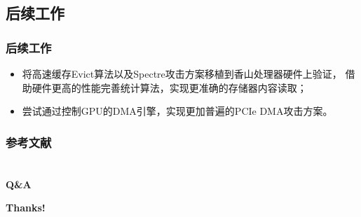 \documentclass[presentation,aspectratio=169]{beamer}
\begin{document}
\subsection{后续工作}
\begin{frame}
\frametitle{后续工作}
    \begin{itemize}
        \setlength\itemsep{1em}
        \large
        \item 将高速缓存Evict算法以及Spectre攻击方案移植到香山处理器硬件上验证，
        借助硬件更高的性能完善统计算法，实现更准确的存储器内容读取；
        \item 尝试通过控制GPU的DMA引擎，实现更加普遍的PCIe DMA攻击方案。
    \end{itemize}
\end{frame}


\nocite{*}

\begin{frame}[t,allowframebreaks]
    \frametitle{参考文献}
    \printbibliography[title={参考文献}]
\end{frame}


\section{}
\begin{frame}{}
    \centering
    \Huge\bfseries\textcolor{xmucolor}{Q\&A}
\end{frame}

\begin{frame}{}
    \centering
    \Huge\bfseries\textcolor{xmucolor}{Thanks!}
\end{frame}

\end{document}
